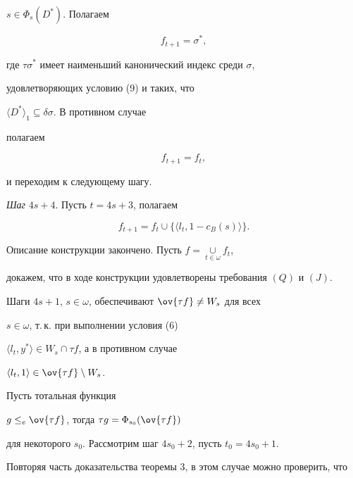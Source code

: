 $s\in\Phi_s(D^*)$. Полагаем


$$


f_{t+1}=\sigma^*,


$$


где $\tau\sigma^*$ имеет наименьший канонический индекс среди $\sigma$,


удовлетворяющих условию (9) и таких, что


$\langle D^*\rangle_1\subseteq\delta\sigma$. В противном случае


полагаем


$$


f_{t+1}=f_t,


$$


и переходим к следующему шагу.


\smallskip





{\it Шаг} $4s+4$. Пусть $t=4s+3$, полагаем


\begin{equation*} %


f_{t+1}=f_t\cup\{\langle l_t,1-c_B(s)\rangle\}.


\end{equation*}





Описание конструкции закончено. Пусть $f=\mathop{\cup}\limits_{t\in\omega}f_t$,


докажем, что в ходе конструкции удовлетворены требования $(Q)$ и $(J)$.





Шаги $4s+1$, $s\in\omega$, обеспечивают $\ov{\tau f}\neq W_s$ для всех


$s\in\omega$, т.\,к. при выполнении условия (6)


$\langle l_t,y^*\rangle\in W_s\cap\tau f$, а в противном случае


$\langle l_t,1\rangle\in\ov{\tau f}\setminus W_s$.





Пусть тотальная функция


$g\leq_e\ov{\tau f}$, тогда $\tau g=\Phi_{s_0}(\ov{\tau f})$


для некоторого $s_0$. Рассмотрим шаг $4s_0+2$, пусть $t_0=4s_0+1$. 


Повторяя часть доказательства теоремы 3, в этом случае можно проверить, что


